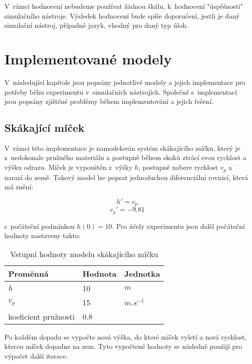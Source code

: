 V~rámci hodnocení nebudeme používat žádnou škálu, k~hodnocení "úspěšnosti" simulačního nástroje. Výsledek hodnocení bude spíše doporučení, jestli je daný simulační nástroj, případně jazyk, vhodný pro daný typ úloh.


\section{Implementované modely}
\label{implementace}
V~následující kapitole jsou popsány jednotlivé modely a jejich implementace pro potřeby běhu experimentu v~simulačních nástrojích. Společně s~implementací jsou popsány zjištěné problémy během implementování a jejich řešení. 

\subsection*{Skákající míček}
\label{micek-desc}
V~rámci této implementace je namodelován systém skákajícího míčku, který je z~nedokonale pružného materiálu a postupně během skoků ztrácí svou rychlost a výšku odrazu. Míček je vypouštěn z~výšky $h$, postupně nabere rychlost $v_p$ a narazí do země. Takový model lze popsat jednoduchou diferenciální rovnicí, která má znění:

\begin{equation}
    h' = v_p
\end{equation}
\begin{equation}
    v_p ' = -9.81
\end{equation}

s~počáteční podmínkou $h(0) = 10$. Pro účely experimentu jsou další počáteční hodnoty nastaveny takto:

\begin{center}
\begin{table}[ht]
    \centering
\begin{tabular}{|l|l|l|}
\hline
Proměnná             & Hodnota & Jednotka    \\ \hline
$h$                    &   10     & $m$     \\ \hline
$v_p$                   &    15   & $m.s^{-1}$ \\ \hline
koeficient pružnosti &  0.8    &             \\ \hline
\end{tabular}
    \caption{Vstupní hodnoty modelu skákajícího míčku}
    \label{tab:micek-hodnoty}
\end{table}
\end{center}
Po každém dopadu se vypočte nová výška, do které míček vyletí a nová rychlost, kterou míček dopadne na zem. Tyto vypočtené hodnoty se následně použijí pro výpočet další iterace. 

